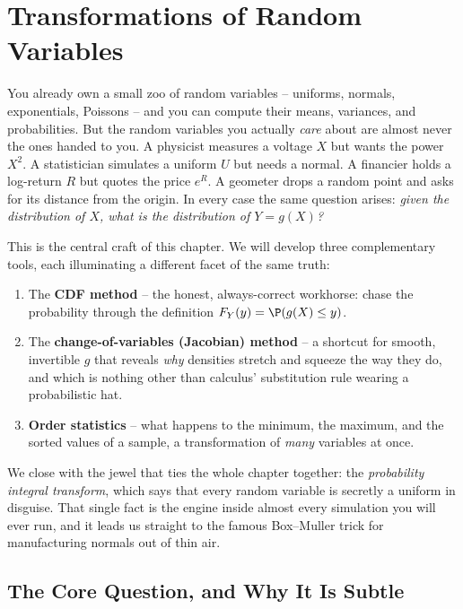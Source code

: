 \chapter{Transformations of Random Variables}

You already own a small zoo of random variables -- uniforms, normals, exponentials,
Poissons -- and you can compute their means, variances, and probabilities. But the
random variables you actually \emph{care} about are almost never the ones handed to you.
A physicist measures a voltage $X$ but wants the power $X^2$. A statistician simulates a
uniform $U$ but needs a normal. A financier holds a log-return $R$ but quotes the price
$e^{R}$. A geometer drops a random point and asks for its distance from the origin. In
every case the same question arises: \emph{given the distribution of $X$, what is the
distribution of $Y = g(X)$?}

This is the central craft of this chapter. We will develop three complementary tools,
each illuminating a different facet of the same truth:

\begin{enumerate}
  \item The \textbf{CDF method} -- the honest, always-correct workhorse: chase the
        probability through the definition $F_Y(y) = \P(g(X) \le y)$.
  \item The \textbf{change-of-variables (Jacobian) method} -- a shortcut for smooth,
        invertible $g$ that reveals \emph{why} densities stretch and squeeze the way they
        do, and which is nothing other than calculus' substitution rule wearing a
        probabilistic hat.
  \item \textbf{Order statistics} -- what happens to the minimum, the maximum, and the
        sorted values of a sample, a transformation of \emph{many} variables at once.
\end{enumerate}

We close with the jewel that ties the whole chapter together: the \emph{probability
integral transform}, which says that every random variable is secretly a uniform in
disguise. That single fact is the engine inside almost every simulation you will ever
run, and it leads us straight to the famous Box--Muller trick for manufacturing normals
out of thin air.

\chapterline

\section{The Core Question, and Why It Is Subtle}
\label{ch16:core}

